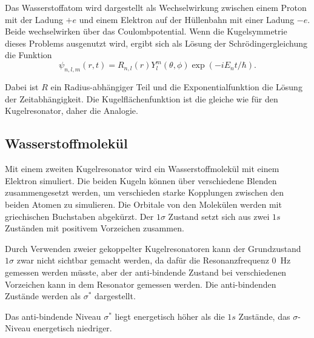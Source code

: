 Das Wasserstoffatom wird dargestellt als Wechselwirkung zwischen einem Proton mit der Ladung $+e$ und einem Elektron auf der Hüllenbahn mit einer Ladung $-e$. Beide wechselwirken über das Coulombpotential. Wenn die Kugelsymmetrie dieses Problems ausgenutzt wird, ergibt sich als Lösung der Schrödingergleichung die Funktion 
\begin{equation*}
    \psi_{n,l,m} (r,t) = R_{n,l}(r) Y_{l}^m(\theta, \phi) \exp(-i E_n t/\hbar).
\end{equation*}

Dabei ist $R$ ein Radius-abhängiger Teil und die Exponentialfunktion die Lösung der Zeitabhängigkeit. 
Die Kugelflächenfunktion ist die gleiche wie für den Kugelresonator, daher die Analogie.

\subsection{Wasserstoffmolekül}
\label{sec:Wasserstoffmolekül}

Mit einem zweiten Kugelresonator wird ein Wasserstoffmolekül mit einem Elektron simuliert. 
Die beiden Kugeln können über verschiedene Blenden zusammengesetzt werden, um verschieden starke Kopplungen zwischen den beiden Atomen zu simulieren. 
Die Orbitale von den Molekülen werden mit griechischen Buchstaben abgekürzt. Der $1\sigma$ Zustand setzt sich aus zwei $1s$ Zuständen mit positivem Vorzeichen zusammen. \cite{QM2}

Durch Verwenden zweier gekoppelter Kugelresonatoren kann der Grundzustand $1\sigma$ zwar nicht sichtbar gemacht werden, da dafür die Resonanzfrequenz \SI{0}{\hertz} gemessen werden müsste, aber der anti-bindende Zustand bei verschiedenen Vorzeichen kann in dem Resonator gemessen werden. Die anti-bindenden Zustände werden als $\sigma^*$ dargestellt. 

Das anti-bindende Niveau $\sigma^*$ liegt energetisch höher als die $1s$ Zustände, das $\sigma$-Niveau energetisch niedriger. \cite{QM2}








